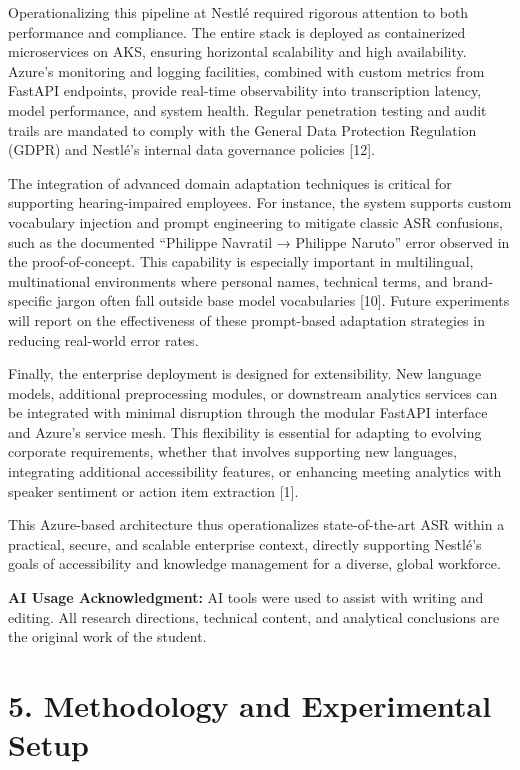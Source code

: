 \documentclass[12pt,a4paper]{article}
\begin{document}
Operationalizing this pipeline at Nestlé required rigorous attention to both performance and compliance. The entire stack is deployed as containerized microservices on AKS, ensuring horizontal scalability and high availability. Azure’s monitoring and logging facilities, combined with custom metrics from FastAPI endpoints, provide real-time observability into transcription latency, model performance, and system health. Regular penetration testing and audit trails are mandated to comply with the General Data Protection Regulation (GDPR) and Nestlé’s internal data governance policies [12].


The integration of advanced domain adaptation techniques is critical for supporting hearing-impaired employees. For instance, the system supports custom vocabulary injection and prompt engineering to mitigate classic ASR confusions, such as the documented “Philippe Navratil → Philippe Naruto” error observed in the proof-of-concept. This capability is especially important in multilingual, multinational environments where personal names, technical terms, and brand-specific jargon often fall outside base model vocabularies [10]. Future experiments will report on the effectiveness of these prompt-based adaptation strategies in reducing real-world error rates.


Finally, the enterprise deployment is designed for extensibility. New language models, additional preprocessing modules, or downstream analytics services can be integrated with minimal disruption through the modular FastAPI interface and Azure’s service mesh. This flexibility is essential for adapting to evolving corporate requirements, whether that involves supporting new languages, integrating additional accessibility features, or enhancing meeting analytics with speaker sentiment or action item extraction [1].


This Azure-based architecture thus operationalizes state-of-the-art ASR within a practical, secure, and scalable enterprise context, directly supporting Nestlé’s goals of accessibility and knowledge management for a diverse, global workforce.


\textbf{AI Usage Acknowledgment:} AI tools were used to assist with writing and editing. All research directions, technical content, and analytical conclusions are the original work of the student.


\section{5. Methodology and Experimental Setup}
\end{document}
